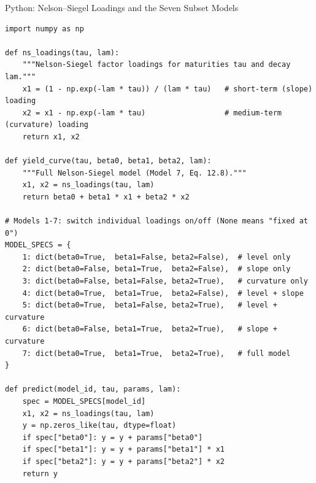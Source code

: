 \documentclass[aspectratio=169,10pt]{beamer}
\begin{document}
\begin{frame}[fragile]{Python: Nelson--Siegel Loadings and the Seven Subset Models}
\begin{lstlisting}[caption={Building blocks for the seven subset Nelson-Siegel models (Eqs. 12.1-12.8)}]
import numpy as np

def ns_loadings(tau, lam):
    """Nelson-Siegel factor loadings for maturities tau and decay lam."""
    x1 = (1 - np.exp(-lam * tau)) / (lam * tau)   # short-term (slope) loading
    x2 = x1 - np.exp(-lam * tau)                  # medium-term (curvature) loading
    return x1, x2

def yield_curve(tau, beta0, beta1, beta2, lam):
    """Full Nelson-Siegel model (Model 7, Eq. 12.8)."""
    x1, x2 = ns_loadings(tau, lam)
    return beta0 + beta1 * x1 + beta2 * x2

# Models 1-7: switch individual loadings on/off (None means "fixed at 0")
MODEL_SPECS = {
    1: dict(beta0=True,  beta1=False, beta2=False),  # level only
    2: dict(beta0=False, beta1=True,  beta2=False),  # slope only
    3: dict(beta0=False, beta1=False, beta2=True),   # curvature only
    4: dict(beta0=True,  beta1=True,  beta2=False),  # level + slope
    5: dict(beta0=True,  beta1=False, beta2=True),   # level + curvature
    6: dict(beta0=False, beta1=True,  beta2=True),   # slope + curvature
    7: dict(beta0=True,  beta1=True,  beta2=True),   # full model
}

def predict(model_id, tau, params, lam):
    spec = MODEL_SPECS[model_id]
    x1, x2 = ns_loadings(tau, lam)
    y = np.zeros_like(tau, dtype=float)
    if spec["beta0"]: y = y + params["beta0"]
    if spec["beta1"]: y = y + params["beta1"] * x1
    if spec["beta2"]: y = y + params["beta2"] * x2
    return y
\end{lstlisting}
\end{frame}
\end{document}
